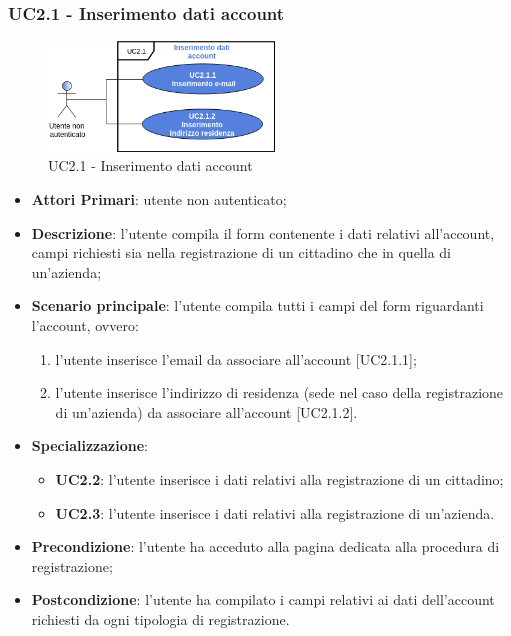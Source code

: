 \subsubsection{UC2.1 - Inserimento dati account}
\begin{figure}[h]
	\includegraphics[width=6cm]{res/images/UC2-1RegistrazioneGenerale.png}
	\centering
	\caption{UC2.1 - Inserimento dati account}
\end{figure}
\begin{itemize}
	\item \textbf{Attori Primari}: utente non autenticato;
	\item \textbf{Descrizione}: l'utente compila il form contenente i dati relativi all'account, campi richiesti sia nella registrazione di un cittadino che in quella di un'azienda;
	\item \textbf{Scenario principale}: l'utente compila tutti i campi del form riguardanti l'account, ovvero:
	\begin{enumerate}[label=\alph*.]
		\item l'utente inserisce l'email da associare all'account [UC2.1.1];
		\item l'utente inserisce l'indirizzo di residenza (sede nel caso della registrazione di un'azienda) da associare all'account [UC2.1.2].
	\end{enumerate}
	\item \textbf{Specializzazione}:
		\begin{itemize}
			\item \textbf{UC2.2}: l'utente inserisce i dati relativi alla registrazione di un cittadino;
			\item \textbf{UC2.3}: l'utente inserisce i dati relativi alla registrazione di un'azienda.
			
		\end{itemize}
	\item \textbf{Precondizione}: l'utente ha acceduto alla pagina dedicata alla procedura di registrazione;
	\item \textbf{Postcondizione}: l'utente ha compilato i campi relativi ai dati dell'account richiesti da ogni tipologia di registrazione.
	\end{itemize}
